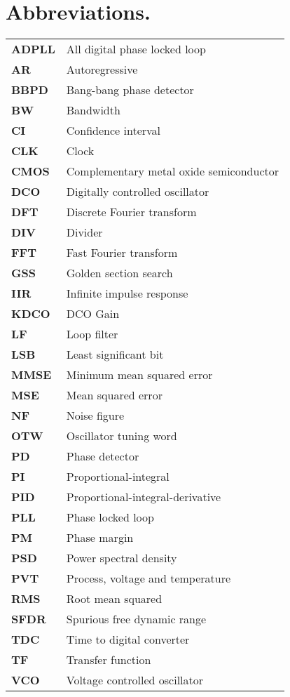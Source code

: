 \section*{Abbreviations.}
	\begin{table}[htb!]
	\renewcommand*{\arraystretch}{1.45}\large
	\begin{tabular}{@{}ll}
		\textbf{\textsf{ADPLL}}	&	All digital phase locked loop \\
		\textbf{\textsf{AR}}	&	Autoregressive \\
		\textbf{\textsf{BBPD}}	&	Bang-bang phase detector \\
		\textbf{\textsf{BW}}	&	Bandwidth \\
		\textbf{\textsf{CI}}	&	Confidence interval \\
		\textbf{\textsf{CLK}}	&	Clock \\
		\textbf{\textsf{CMOS}}	&	Complementary metal oxide semiconductor \\
		\textbf{\textsf{DCO}}	&	Digitally controlled oscillator \\
		\textbf{\textsf{DFT}}	&	Discrete Fourier transform \\
		\textbf{\textsf{DIV}}	&	Divider \\
		\textbf{\textsf{FFT}}	&	Fast Fourier transform \\
		\textbf{\textsf{GSS}}	&	Golden section search \\
		\textbf{\textsf{IIR}}	&	Infinite impulse response \\
		\textbf{\textsf{KDCO}}	&	DCO Gain \\
		\textbf{\textsf{LF}}	&	Loop filter \\
		\textbf{\textsf{LSB}}	&	Least significant bit \\
		\textbf{\textsf{MMSE}}	&	Minimum mean squared error \\
		\textbf{\textsf{MSE}}	&	Mean squared error \\
		\textbf{\textsf{NF}}	&	Noise figure \\
		\textbf{\textsf{OTW}}	&	Oscillator tuning word \\
		\textbf{\textsf{PD}}	&	Phase detector \\
		\textbf{\textsf{PI}}	&	Proportional-integral \\
		\textbf{\textsf{PID}}	&	Proportional-integral-derivative \\
		\textbf{\textsf{PLL}}	&	Phase locked loop \\
		\textbf{\textsf{PM}}	&	Phase margin \\
		\textbf{\textsf{PSD}}	&	Power spectral density \\
		\textbf{\textsf{PVT}}	&	Process, voltage and temperature \\
		\textbf{\textsf{RMS}}	&	Root mean squared \\
		\textbf{\textsf{SFDR}}	&	Spurious free dynamic range \\
		\textbf{\textsf{TDC}}	&	Time to digital converter \\
		\textbf{\textsf{TF}}	&	Transfer function \\
		\textbf{\textsf{VCO}}	&	Voltage controlled oscillator \\
	\end{tabular}
	\end{table}
